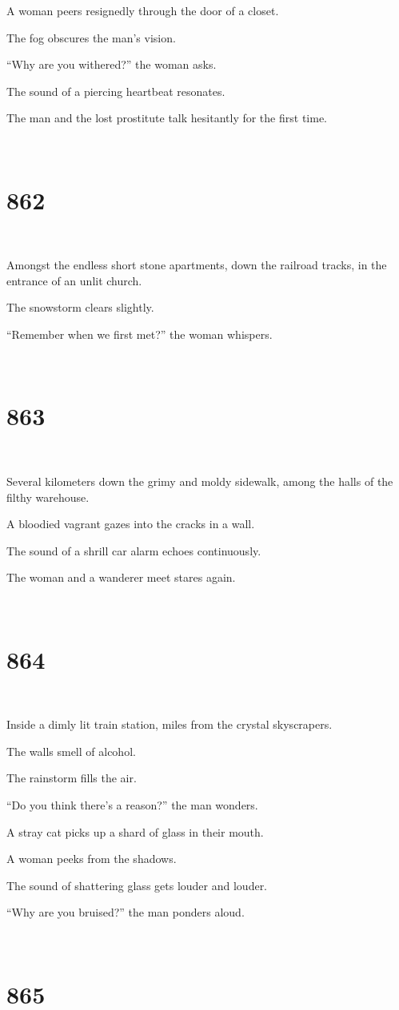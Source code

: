 \documentclass{report}
\begin{document}
A woman peers resignedly through the door of a closet.

The fog obscures the man's vision.

``Why are you withered?'' the woman asks.

The sound of a piercing heartbeat resonates.

The man and the lost prostitute talk hesitantly for the first time.

~
\chapter*{862}
~

Amongst the endless short stone apartments, down the railroad tracks, in the entrance of an unlit church.

The snowstorm clears slightly.

``Remember when we first met?'' the woman whispers.

~
\chapter*{863}
~

Several kilometers down the grimy and moldy sidewalk, among the halls of the filthy warehouse.

A bloodied vagrant gazes into the cracks in a wall.

The sound of a shrill car alarm echoes continuously.

The woman and a wanderer meet stares again.

~
\chapter*{864}
~

Inside a dimly lit train station, miles from the crystal skyscrapers.

The walls smell of alcohol.

The rainstorm fills the air.

``Do you think there's a reason?'' the man wonders.

A stray cat picks up a shard of glass in their mouth.

A woman peeks from the shadows.

The sound of shattering glass gets louder and louder.

``Why are you bruised?'' the man ponders aloud.

~
\chapter*{865}
~
\end{document}
